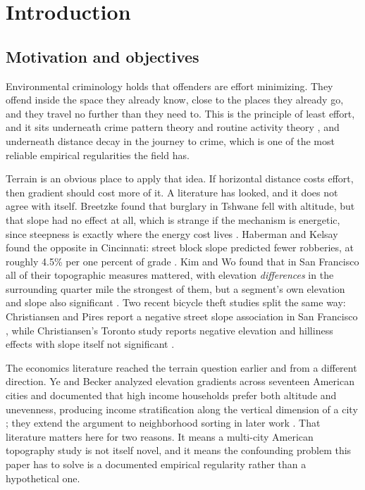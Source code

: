 \documentclass[10pt,letterpaper]{article}
\begin{document}
\linenumbers

\section*{Introduction}

\subsection*{Motivation and objectives}

Environmental criminology holds that offenders are effort minimizing. They offend
inside the space they already know, close to the places they already go, and they
travel no further than they need to. This is the principle of least effort, and it
sits underneath crime pattern theory \cite{brantingham1993} and routine activity
theory \cite{cohen1979}, and underneath distance decay in the journey to crime,
which is one of the most reliable empirical regularities the field has.

Terrain is an obvious place to apply that idea. If horizontal distance costs effort,
then gradient should cost more of it. A literature has looked, and it does not agree
with itself. Breetzke found that burglary in Tshwane fell with altitude, but that
slope had no effect at all, which is strange if the mechanism is energetic, since
steepness is exactly where the energy cost lives \cite{breetzke2012}. Haberman and
Kelsay found the opposite in Cincinnati: street block slope predicted fewer
robberies, at roughly 4.5\% per one percent of grade \cite{haberman2021}. Kim and Wo
found that in San Francisco all of their topographic measures mattered, with
elevation \emph{differences} in the surrounding quarter mile the strongest of them,
but a segment's own elevation and slope also significant \cite{kimwo2023}. Two
recent bicycle theft studies split the same way: Christiansen and Pires report a
negative street slope association in San Francisco \cite{bikesf2026}, while
Christiansen's Toronto study reports negative elevation and hilliness effects with
slope itself not significant \cite{biketoronto2026}.

The economics literature reached the terrain question earlier and from a different
direction. Ye and Becker analyzed elevation gradients across seventeen American
cities and documented that high income households prefer both altitude and
unevenness, producing income stratification along the vertical dimension of a city
\cite{yebecker2018}; they extend the argument to neighborhood sorting in later work
\cite{yebecker2024}. That literature matters here for two reasons. It means a
multi-city American topography study is not itself novel, and it means the
confounding problem this paper has to solve is a documented empirical regularity
rather than a hypothetical one.
\end{document}
